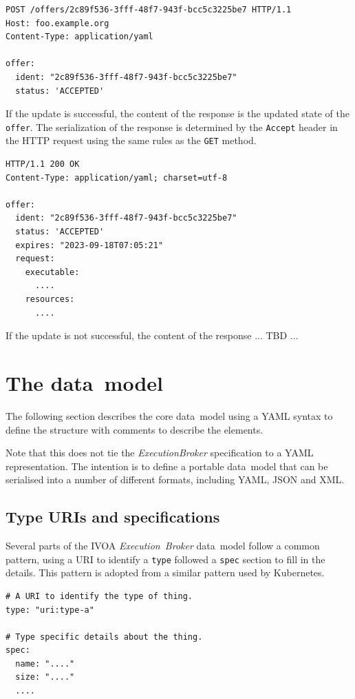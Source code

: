 \documentclass[11pt,a4paper]{ivoa}
\newcommand{\datamodel} {data~model}
\newcommand{\ivoa} {IVOA}
\newcommand{\execbrokerclass} {\textit{ExecutionBroker}}
\newcommand{\executionbroker} {\textit{Execution~Broker}}
\newcommand{\kubernetes} {Kubernetes}
\newcommand{\codeword}[1] {\texttt{#1}}
\begin{document}
\begin{lstlisting}[]
POST /offers/2c89f536-3fff-48f7-943f-bcc5c3225be7 HTTP/1.1
Host: foo.example.org
Content-Type: application/yaml

offer:
  ident: "2c89f536-3fff-48f7-943f-bcc5c3225be7"
  status: 'ACCEPTED'
\end{lstlisting}

If the update is successful, the content of the response is the updated state of the \codeword{offer}.
The serialization of the response is determined by the \codeword{Accept} header in the HTTP request
using the same rules as the \codeword{GET} method.

\begin{lstlisting}[]
HTTP/1.1 200 OK
Content-Type: application/yaml; charset=utf-8

offer:
  ident: "2c89f536-3fff-48f7-943f-bcc5c3225be7"
  status: 'ACCEPTED'
  expires: "2023-09-18T07:05:21"
  request:
    executable:
      ....
    resources:
      ....
\end{lstlisting}

If the update is not successful, the content of the response ... TBD ...


\pagebreak

\section{The \datamodel{}}
\label{sect-datamodel}

The following section describes the core \datamodel{} using a YAML syntax
to define the structure with comments to describe the elements.

Note that this does not tie the \execbrokerclass{} specification to a YAML representation.
The intention is to define a portable \datamodel{} that can be serialised
into a number of different formats, including YAML, JSON and XML.

\subsection{Type URIs and specifications}
\label{sub-type-and-spec}

Several parts of the \ivoa{} \executionbroker{} \datamodel{} follow a common pattern, using a URI
to identify a \codeword{type} followed a \codeword{spec} section to fill in the details.
This pattern is adopted from a similar pattern used by \kubernetes{}.

\begin{lstlisting}[]
# A URI to identify the type of thing.
type: "uri:type-a"

# Type specific details about the thing.
spec:
  name: "...."
  size: "...."
  ....
\end{lstlisting}
\end{document}
